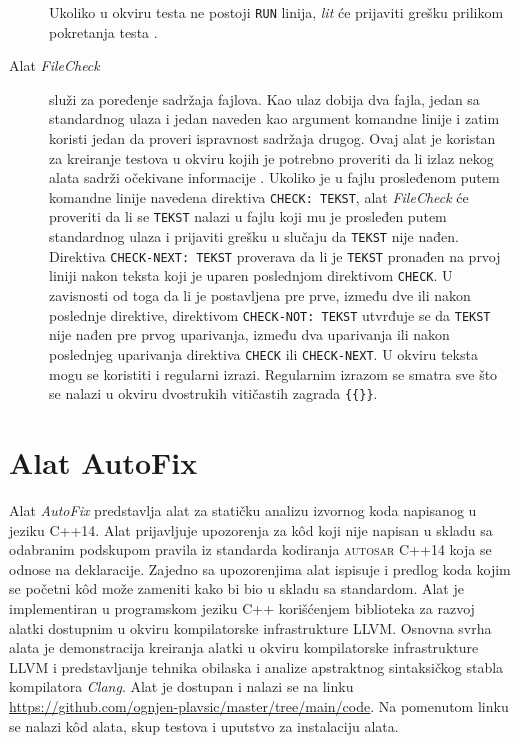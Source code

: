 \documentclass[12pt,oneside]{memoir}
\begin{document}
\begin{description}
Ukoliko u okviru testa ne postoji \texttt{RUN} linija, \textit{lit} \'{c}e prijaviti gre\v{s}ku prilikom pokretanja testa \cite{LIT}. \par
  \item[Alat \textit{FileCheck}] slu\v{z}i za poređenje sadr\v{z}aja fajlova. Kao ulaz dobija dva fajla, jedan sa standardnog ulaza i jedan naveden kao argument komandne linije i zatim koristi jedan da proveri ispravnost sadr\v{z}aja drugog. Ovaj alat je koristan za kreiranje testova u okviru kojih je potrebno proveriti da li izlaz nekog alata sadr\v{z}i o\v{c}ekivane informacije \cite{FileCheck}. 
Ukoliko je u fajlu prosleđenom putem komandne linije navedena direktiva \texttt{CHECK: TEKST}, alat \textit{FileCheck} \'{c}e proveriti da li se \texttt{TEKST} nalazi u fajlu koji mu je prosleđen putem standardnog ulaza i prijaviti gre\v{s}ku u slu\v{c}aju da \texttt{TEKST} nije nađen.
Direktiva \texttt{CHECK-NEXT: TEKST} proverava da li je \texttt{TEKST} pronađen na prvoj liniji nakon teksta koji je uparen poslednjom direktivom \texttt{CHECK}. U zavisnosti od toga da li je postavljena pre prve, između dve ili nakon poslednje direktive, direktivom \texttt{CHECK-NOT: TEKST} utvrđuje se da  \texttt{TEKST} nije nađen pre prvog uparivanja, između dva uparivanja ili nakon poslednjeg uparivanja direktiva \texttt{CHECK} ili \texttt{CHECK-NEXT}. U okviru teksta mogu se koristiti i regularni izrazi. Regularnim izrazom se smatra sve \v{s}to se nalazi u okviru dvostrukih viti\v{c}astih zagrada \texttt{\{\{\}\}}.
\end{description}


\chapter{Alat AutoFix}
\label{chp:autofix}

Alat \textit{AutoFix} predstavlja alat za stati\v{c}ku analizu izvornog koda napisanog u jeziku C++14. Alat prijavljuje upozorenja
za k\^{o}d koji nije napisan u skladu sa odabranim podskupom pravila iz standarda kodiranja \textsc{autosar} C++14 koja se odnose na deklaracije. Zajedno sa upozorenjima alat 
ispisuje i predlog koda kojim se po\v{c}etni k\^{o}d mo\v{z}e zameniti kako bi bio u skladu sa standardom.
Alat je implementiran u programskom jeziku C++ kori\v{s}\'{c}enjem biblioteka za razvoj alatki dostupnim u okviru kompilatorske infrastrukture LLVM.
Osnovna svrha alata je demonstracija kreiranja alatki u okviru kompilatorske infrastrukture LLVM i predstavljanje tehnika obilaska i analize apstraktnog sintaksi\v{c}kog stabla kompilatora \textit{Clang}. 
Alat je dostupan i nalazi se na linku \url{https://github.com/ognjen-plavsic/master/tree/main/code}. Na pomenutom linku se nalazi k\^{o}d alata, skup testova i uputstvo za instalaciju alata.
\end{document}
